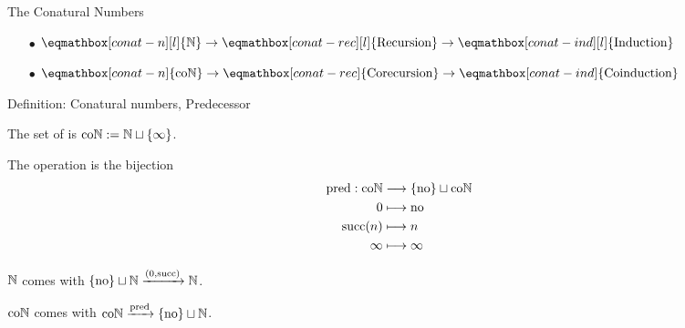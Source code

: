 
\begin{frame}{The Conatural Numbers} %

  \begin{itemize}[nosep]
    \item[$\bullet$] $\eqmathbox[conat-n][l]{\N} \to \eqmathbox[conat-rec][l]{\text{Recursion}} \to \eqmathbox[conat-ind][l]{\text{Induction}}$
    \item[$\bullet$] $\eqmathbox[conat-n]{\coN} \to \eqmathbox[conat-rec]{\text{Corecursion}} \to \eqmathbox[conat-ind]{\text{Coinduction}}$
  \end{itemize}

  \pause

  \begin{block}{Definition: Conatural numbers, Predecessor}

    \par The set of  is $\mathrm{co}\mathbb{N} := \mathbb{N} \sqcup \{\infty\}$.
    \par The  operation is the bijection
    \begin{align*}
      \operatorname{pred} : \mathrm{co}\mathbb{N}
      &\longrightarrow \{\mathrm{no}\} \sqcup \mathrm{co}\mathbb{N}
      \\
      0
      &\longmapsto \mathrm{no}
      \\
      \operatorname{succ}(n)
      &\longmapsto n
      \\
      \infty
      &\longmapsto \infty
    \end{align*}
  \end{block}

  \pause

  \par $\mathbb{N}$ comes with $\{\mathrm{no}\} \sqcup \mathbb{N} \xrightarrow{(0, \operatorname{succ})} \mathbb{N}$.
  \par $\mathrm{co}\mathbb{N}$ comes with $\mathrm{co}\mathbb{N} \xrightarrow{\operatorname{pred}} \{\mathrm{no}\} \sqcup \mathbb{N}$.

\end{frame}

